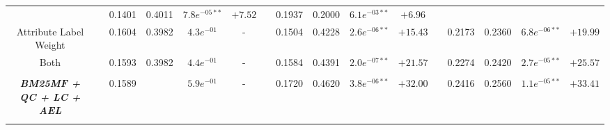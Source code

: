 \begin{table*}
{\begin{tabular}{cc@{\hs}rrccc@{\hs}rrccc@{\hs}rrcc}
                                   & \phantom{a} & 0.1401 & 0.4011 & $7.8e^{-05**}$ & $+7.52$
                                   & \phantom{a} & 0.1937 & 0.2000 & $6.1e^{-03**}$ & $+6.96$ \\
{\raggedright Attribute Label Weight} & \phantom{a} & 0.1604 & 0.3982 & $4.3e^{-01}$ & -
                                      & \phantom{a} & 0.1504 & 0.4228 & $2.6e^{-06**}$ & $+15.43$
                                      & \phantom{a} & 0.2173 & 0.2360 & $6.8e^{-06**}$ & $+19.99$ \\
{\raggedright Both} & \phantom{a} & 0.1593 & 0.3982 & $4.4e^{-01}$ & -
                    & \phantom{a} & 0.1584 & 0.4391 & $2.0e^{-07**}$ & $+21.57$
                    & \phantom{a} & 0.2274 & 0.2420 & $2.7e^{-05**}$ & $+25.57$ \\
\\
\emph{\textbf{BM25MF + QC + LC + AEL}} & \phantom{a} & 0.1589 &  & $5.9e^{-01}$ & -
                                       & \phantom{a} & 0.1720 & 0.4620 & $3.8e^{-06**}$ & $+32.00$
                                       & \phantom{a} & 0.2416 & 0.2560 & $1.1e^{-05**}$ & $+33.41$ \\
\midrule
\\[-0.2cm]


\end{tabular}}
\end{table*}
